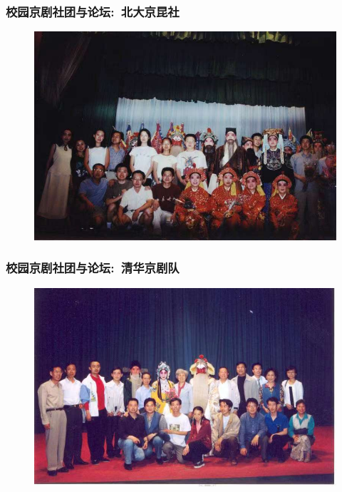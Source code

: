 \documentclass[cjk,slidestop,compress,mathserif,blue]{beamer}
\begin{document}
\frame
{
	\frametitle{校园京剧社团与论坛:~北大京昆社}
\begin{figure}[h!]
\centering
\vspace{-0.3in}
\includegraphics[height=0.70\textwidth,width=1.00\textwidth,clip]{Figures_Peking-Opera/PekOpe_PKU-3.jpg}
\label{PKU-3}
\end{figure}
}

\frame
{
	\frametitle{校园京剧社团与论坛:~清华京剧队}
\begin{figure}[h!]
\centering
\vspace{-0.3in}
\includegraphics[height=0.70\textwidth,width=1.00\textwidth,clip]{Figures_Peking-Opera/PekOpe_THU-1.jpg}
\label{THU-1}
\end{figure}
}
\end{document}

